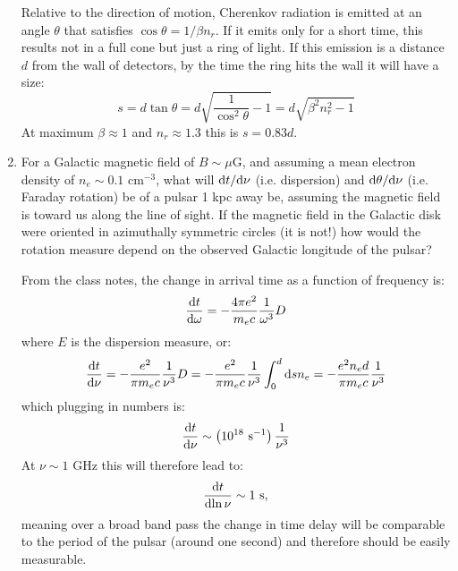 \documentclass[11pt, preprint]{article}
\begin{document}
\begin{enumerate}
  \begin{answer}
    Relative to the direction of motion, Cherenkov radiation is
    emitted at an angle $\theta$ that satisfies $\cos\theta = 1/\beta
    n_r$. If it emits only for a short time, this results not in a
    full cone but just a ring of light. If this emission is a distance
    $d$ from the wall of detectors, by the time the ring hits the wall
    it will have a size:
    \begin{equation}
      s = d \tan\theta = d \sqrt{\frac{1}{\cos^2\theta} - 1} =
      d\sqrt{\beta^2 n_r^2 -1}
    \end{equation}
    At maximum $\beta\approx 1$ and $n_r\approx 1.3$ this is $s = 0.83
    d$.
  \end{answer}
\item For a Galactic magnetic field of $B\sim \mu$G, and assuming a
  mean electron density of $n_e \sim 0.1$ cm$^{-3}$, what will ${\rm
    d}t/{\rm d}\nu$ (i.e. dispersion) and ${\rm d}\theta/{\rm d}\nu$
  (i.e. Faraday rotation) be of a pulsar 1 kpc away be, assuming the
  magnetic field is toward us along the line of sight. If the magnetic
  field in the Galactic disk were oriented in azimuthally symmetric
  circles (it is not!) how would the rotation measure depend on the
  observed Galactic longitude of the pulsar?

  \begin{answer}
    From the class notes, the change in arrival time as a function of
    frequency is:
    \begin{equation}
      \frac{{\rm d}t}{{\rm d}{\omega}} = - \frac{4\pi e^2}{m_e c}
        \frac{1}{\omega^3} D
    \end{equation}
    where $E$ is the dispersion measure, or:
    \begin{equation}
      \frac{{\rm d}t}{{\rm d}{\nu}} =
        - \frac{e^2}{\pi m_e c} \frac{1}{\nu^3} D  =
        - \frac{e^2}{\pi m_e c} \frac{1}{\nu^3} \int_0^d {\rm d}s n_e =
        - \frac{e^2 n_e d}{\pi m_e c} \frac{1}{\nu^3}
    \end{equation}
    which plugging in numbers is:
    \begin{equation}
      \frac{{\rm d}t}{{\rm d}{\nu}} \sim \left(10^{18} {\rm
        ~s}^{-1}\right) \frac{1}{\nu^3}
    \end{equation}
    At $\nu \sim 1$ GHz this will therefore lead to: 
    \begin{equation}
      \frac{{\rm d}t}{{\rm d}{\ln \nu}} \sim 1 {\rm ~s},
    \end{equation}
    meaning over a broad band pass the change in time delay will be 
    comparable to the period of the pulsar (around one second) and
    therefore should be easily measurable.


\end{answer}
\end{enumerate}
\end{document}
